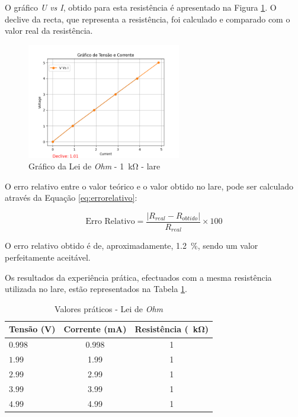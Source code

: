 O gráfico \textit{U vs I}, obtido para esta resistência é apresentado na Figura \ref{fig:grafico_LaRE_1k}. O declive da recta, que representa a resistência, foi calculado e comparado com o valor real da resistência. 

\begin{figure}[hbtp]
	\centering
	\includegraphics[width=0.6\textwidth]{figures/ohm_graph.png}
	\caption{Gráfico da Lei de \textit{Ohm} - \SI{1}{\kilo\ohm} - \acrshort{lare}}
	\label{fig:grafico_LaRE_1k}
\end{figure}

O erro relativo entre o valor teórico e o valor obtido no \acrshort{lare}, pode ser calculado através da Equação \ref{eq:errorelativo}:

\begin{equation} \label{eq:errorelativo}
	\text{Erro Relativo} = \frac{|R_{real} - R_{obtido}|}{R_{real}} \times 100
\end{equation}

O erro relativo obtido é de, aproximadamente, \SI{1.2}{\percent}, sendo um valor perfeitamente aceitável.

Os resultados da experiência prática, efectuados com a mesma resistência utilizada no \acrshort{lare}, estão representados na Tabela \ref{Table:valoresexperimentaisohm}.

\begin{table}[htb]
	\centering
	\caption{Valores práticos - Lei de \textit{Ohm}} 
	\label{Table:valoresexperimentaisohm}
	\begin{tabular}{lcc}
		\toprule
		Tensão (V)& Corrente (mA) & Resistência (\SI{}{\kilo\ohm}) \\
		\midrule
		$0.998$ & 0.998 & 1  \\
		\midrule
		 $1.99$ & 1.99  & 1  \\
		 \midrule
		 $2.99$ & 2.99  & 1  \\
		 \midrule
		 $3.99$ & 3.99  & 1  \\
		 \midrule
		 $4.99$ & 4.99  & 1  \\
		\bottomrule
	\end{tabular}
\end{table}

